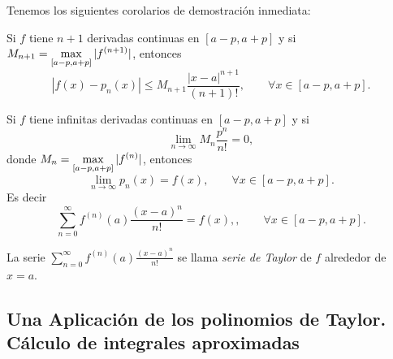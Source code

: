 Tenemos los siguientes corolarios de demostración inmediata:

\begin{corollary}
 Si $f$ tiene $n+1$ derivadas continuas en $[a-p,a+p]$ y si $\displaystyle M_{n+1} = \max_{[a-p,a+p]} |f^{(n+1)}|$, entonces
\[
 |f(x) - p_n(x) | \le M_{n+1} \frac{|x-a|^{n+1}}{(n+1)!},\qquad \forall x \in [a-p,a+p].
\]
\end{corollary}

\begin{corollary}
 Si $f$ tiene infinitas derivadas continuas en $[a-p,a+p]$ y si 
\[
 \lim_{n\to\infty} M_n \frac{p^n}{n!} = 0,
\]
donde $\displaystyle M_n = \max_{[a-p,a+p]} |f^{(n)}|$, entonces
\[
\lim_{n\to\infty} p_n(x) = f(x),\qquad \forall x \in [a-p,a+p].
\]
Es decir
\[
\sum_{n=0}^\infty f^{(n)}(a) \frac{(x-a)^n}{n!} = f(x), ,\qquad \forall x \in [a-p,a+p].
\]
\end{corollary}

\begin{definition}
 La serie $\sum_{n=0}^\infty f^{(n)}(a) \frac{(x-a)^n}{n!}$ se llama \emph{serie de Taylor} de $f$ alrededor de $x=a$.
\end{definition}

\subsection{Una Aplicación de los polinomios de Taylor.\\ Cálculo de integrales aproximadas}



